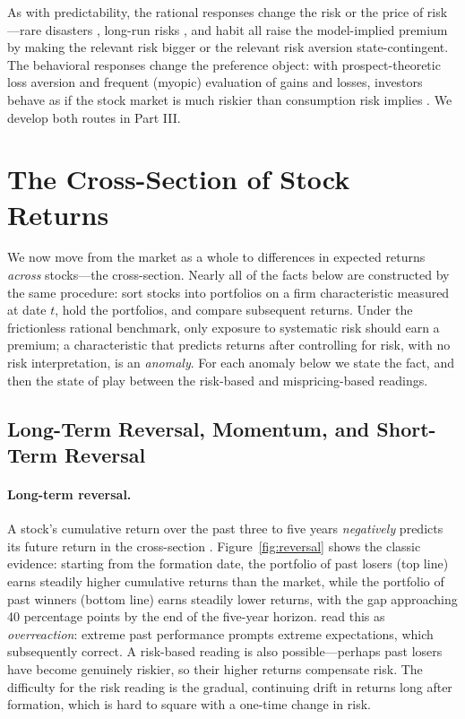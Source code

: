 As with predictability, the rational responses change the risk or the price of risk---rare disasters \citep{rietz1988,barro2006}, long-run risks \citep{bansal2004}, and habit \citep{campbell1999} all raise the model-implied premium by making the relevant risk bigger or the relevant risk aversion state-contingent. The behavioral responses change the preference object: with prospect-theoretic loss aversion and frequent (myopic) evaluation of gains and losses, investors behave as if the stock market is much riskier than consumption risk implies \citep{benartzi1995,barberis2001}. We develop both routes in Part III.

\section{The Cross-Section of Stock Returns}
\label{sec:crosssection}

We now move from the market as a whole to differences in expected returns \emph{across} stocks---the cross-section. Nearly all of the facts below are constructed by the same procedure: sort stocks into portfolios on a firm characteristic measured at date $t$, hold the portfolios, and compare subsequent returns. Under the frictionless rational benchmark, only exposure to systematic risk should earn a premium; a characteristic that predicts returns after controlling for risk, with no risk interpretation, is an \emph{anomaly}. For each anomaly below we state the fact, and then the state of play between the risk-based and mispricing-based readings.

\subsection{Long-Term Reversal, Momentum, and Short-Term Reversal}
\label{sec:momentum}

\paragraph{Long-term reversal.}
A stock's cumulative return over the past three to five years \emph{negatively} predicts its future return in the cross-section \citep{debondt1985}. Figure~\ref{fig:reversal} shows the classic evidence: starting from the formation date, the portfolio of past losers (top line) earns steadily higher cumulative returns than the market, while the portfolio of past winners (bottom line) earns steadily lower returns, with the gap approaching 40 percentage points by the end of the five-year horizon. \citet{debondt1985} read this as \emph{overreaction}: extreme past performance prompts extreme expectations, which subsequently correct. A risk-based reading is also possible---perhaps past losers have become genuinely riskier, so their higher returns compensate risk. The difficulty for the risk reading is the gradual, continuing drift in returns long after formation, which is hard to square with a one-time change in risk.

